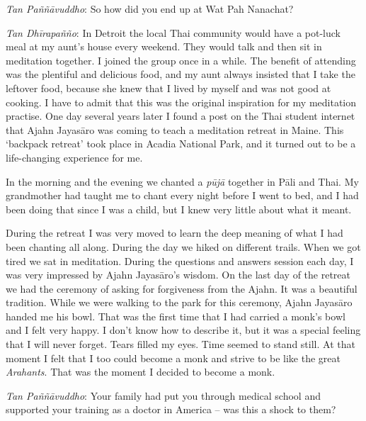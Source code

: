 \emph{Tan Paññāvuddho}: So how did you end up at Wat Pah Nanachat? 

\emph{Tan Dhīrapañño}: In Detroit the local Thai community would have a
pot-luck meal at my aunt's house every weekend. They would talk and then
sit in meditation together. I joined the group once in a while. The
benefit of attending was the plentiful and delicious food, and my aunt
always insisted that I take the leftover food, because she knew that I
lived by myself and was not good at cooking. I have to admit that this
was the original inspiration for my meditation practise. One day several
years later I found a post on the Thai student internet that Ajahn
Jayasāro was coming to teach a meditation retreat in Maine. This
`backpack retreat' took place in Acadia National Park, and it turned out
to be a life-changing experience for me.

In the morning and the evening
we chanted a \emph{pūjā} together in Pāli and Thai. My grandmother had
taught me to chant every night before I went to bed, and I had been
doing that since I was a child, but I knew very little about what it
meant.

During the retreat I was very moved to learn the deep meaning of
what I had been chanting all along. During the day we hiked on different
trails. When we got tired we sat in meditation. During the questions and
answers session each day, I was very impressed by Ajahn Jayasāro's
wisdom. On the last day of the retreat we had the ceremony of asking for
forgiveness from the Ajahn. It was a beautiful tradition. While we were
walking to the park for this ceremony, Ajahn Jayasāro handed me his
bowl. That was the first time that I had carried a monk's bowl and I
felt very happy. I don't know how to describe it, but it was a special
feeling that I will never forget. Tears filled my eyes. Time seemed to
stand still. At that moment I felt that I too could become a monk and
strive to be like the great \emph{Arahants}. That was the moment I
decided to become a monk. 

\emph{Tan Paññāvuddho}: Your family had put you through medical school
and supported your training as a doctor in America -- was this a shock
to them? 

